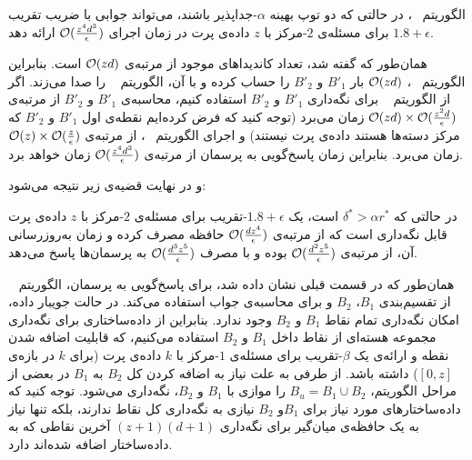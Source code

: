  
 الگوریتم ~، در حالتی که دو توپ بهینه $\alpha$-جداپذیر باشند، می‌تواند جوابی با ضریب تقریب $1.8 + \epsilon$ برای مسئله‌ی $2$-مرکز با $z$ داده‌ی پرت در زمان اجرای $\mathcal{O}(\frac{z^4d^3}{\epsilon})$ ارائه دهد.
 
 
 همان‌طور که گفته شد، تعداد کاندیداهای موجود از مرتبه‌ی $\mathcal{O}(zd)$ است.
 بنابراین الگوریتم ~، $\mathcal{O}(zd)$ بار $B'_1$ و $B'_2$ را حساب کرده و با آن، الگوریتم ~ را صدا می‌زند.
 اگر از الگوریتم ~ برای نگه‌داری $B'_1$ و $B'_2$ استفاده کنیم، محاسبه‌ی $B'_1$ و $B'_2$ از مرتبه‌ی $ \mathcal{O}(zd) \times \mathcal{O}(\frac{z^2d}{\epsilon})$ زمان می‌برد (توجه کنید که فرض کرده‌ایم نقطه‌ی اول $B'_1$ و $B'_2$ که مرکز دسته‌ها هستند داده‌ی پرت نیستند) و اجرای الگوریتم ~، از مرتبه‌ی $\mathcal{O}(z) \times \mathcal{O}(\frac{z}{\epsilon})$ زمان می‌برد. بنابراین زمان پاسخ‌گویی به پرسمان از مرتبه‌ی $\mathcal{O}(\frac{z^4d^3}{\epsilon})$ زمان خواهد برد.
 

و در نهایت قضیه‌ی زیر نتیجه می‌شود:

در حالتی که $\delta^* > \alpha r^*$ است، یک $1.8 + \epsilon$-تقریب برای مسئله‌ی $2$-مرکز با $z$ داده‌ی پرت قابل نگه‌داری است که از مرتبه‌ی $\mathcal{O}(\frac{dz^4}{\epsilon})$ حافظه مصرف کرده و زمان به‌روزرسانی آن، از مرتبه‌ی $\mathcal{O}(\frac{d^2z^5}{\epsilon})$ بوده و با مصرف $\mathcal{O}(\frac{d^3z^5}{\epsilon})$ به پرسمان‌ها پاسخ می‌دهد.

همان‌طور که در قسمت قبلی نشان داده شد، برای پاسخ‌گویی به پرسمان، الگوریتم ~ از تقسیم‌بندی $B_1$، $B_2$ و  برای محاسبه‌ی جواب استفاده می‌کند.
در حالت جویبار داده، امکان نگه‌داری تمام نقاط $B_1$ و $B_2$ وجود ندارد.
بنابراین از داده‌ساختاری برای نگه‌داری مجموعه هسته‌ای از نقاط داخل $B_1$ و $B_2$ استفاده می‌کنیم، که قابلیت اضافه شدن نقطه و ارائه‌ی یک $\beta$-تقریب برای مسئله‌ی $1$-مرکز با $k$ داده‌ی پرت (برای $k$ در بازه‌ی $[0, z]$) داشته باشد.
از طرفی به علت نیاز به اضافه کردن کل $B_2$ به $B_1$ در بعضی از مراحل الگوریتم، $B_u = B_1 \cup B_2$ را موازی با $B_1$ و $B_2$، نگه‌داری می‌شود.
توجه کنید که داده‌ساختارهای مورد نیاز برای $B_1$و $B_2$ نیازی به نگه‌داری کل نقاط ندارند، بلکه تنها نیاز به یک حافظه‌ی میان‌گیر برای نگه‌داری $(z+1)(d+1)$ آخرین نقاطی که به داده‌ساختار اضافه شده‌اند دارد.

